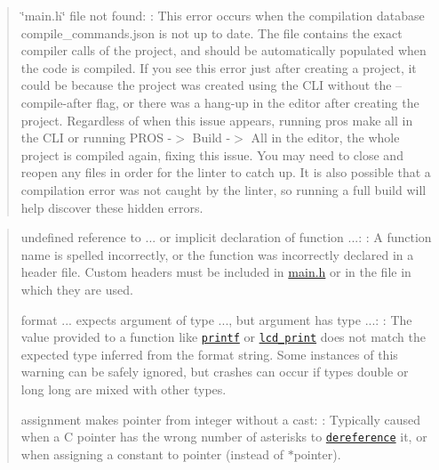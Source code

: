 \begin{quote}

\begin{DoxyItemize}
\item {\ttfamily \char`\"{}main.\+h\char`\"{} file not found}\+: \+: This error occurs when the compilation database {\ttfamily compile\+\_\+commands.\+json} is not up to date. The file contains the exact compiler calls of the project, and should be automatically populated when the code is compiled. If you see this error just after creating a project, it could be because the project was created using the C\+LI without the {\ttfamily –compile-\/after} flag, or there was a hang-\/up in the editor after creating the project. Regardless of when this issue appears, running {\ttfamily pros make all} in the C\+LI or running {\ttfamily P\+R\+OS -\/$>$ Build -\/$>$ All} in the editor, the whole project is compiled again, fixing this issue. You may need to close and reopen any files in order for the linter to catch up. It is also possible that a compilation error was not caught by the linter, so running a full build will help discover these hidden errors. 
\end{DoxyItemize}\end{quote}


\begin{quote}

\begin{DoxyItemize}
\item {\ttfamily undefined reference to ...} or {\ttfamily implicit declaration of function ...}\+: \+: A function name is spelled incorrectly, or the function was incorrectly declared in a header file. Custom headers must be included in {\ttfamily \hyperlink{main_8h}{main.\+h}} or in the file in which they are used.
\item {\ttfamily format ... expects argument of type ..., but argument has type ...}\+: \+: The value provided to a function like \href{http://www.cplusplus.com/reference/cstdio/printf/}{\tt printf} or \href{../../api/c/llemu.html#lcd-print}{\tt lcd\+\_\+print} does not match the expected type inferred from the format string. Some instances of this warning can be safely ignored, but crashes can occur if types {\ttfamily double} or {\ttfamily long long} are mixed with other types.
\item {\ttfamily assignment makes pointer from integer without a cast}\+: \+: Typically caused when a C pointer has the wrong number of asterisks to \href{http://stackoverflow.com/a/4955297/3681958}{\tt dereference} it, or when assigning a constant to {\ttfamily pointer} (instead of {\ttfamily $\ast$pointer}). 
\end{DoxyItemize}\end{quote}


